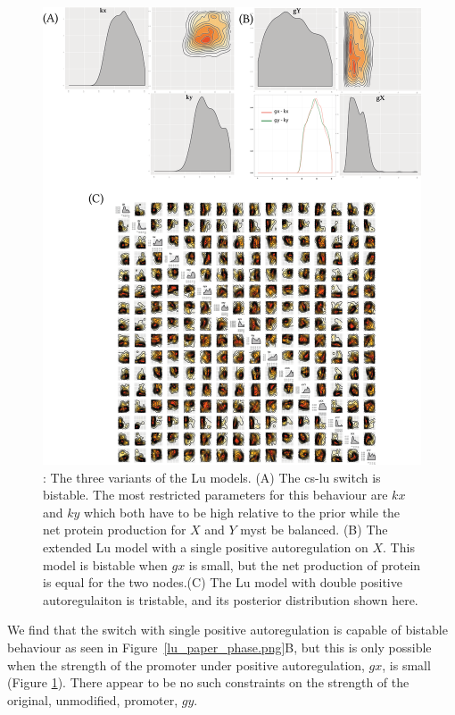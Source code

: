 \begin{figure}[p]
\begin{center}
\includegraphics[scale=0.6]{../../chapters/chapterStabilityFinder/images/lu_paper_post.png}
\caption[LoF caption]{ \label{fig:fig3}: The three variants of the Lu models. (A) The \acrshort{cs-lu} switch is bistable. The most restricted parameters for this behaviour are $kx$ and $ky$ which both have to be high relative to the prior while the net protein production for $X$ and $Y$ myst be balanced. (B) The extended Lu model with a single positive autoregulation on $X$. This model is bistable when $gx$ is small, but the net production of protein is equal for the two nodes.(C) The Lu model with double positive autoregulaiton is tristable, and its posterior distribution shown here. }
\end{center}
\end{figure}
\clearpage

We find that the switch with single positive autoregulation is capable of bistable behaviour as seen in Figure~\ref{lu_paper_phase.png}B, but this is only possible when the strength of the promoter under positive autoregulation, $gx$, is small (Figure \ref{fig:fig3}). There appear to be no such constraints on the strength of the original, unmodified, promoter, $gy$.  

